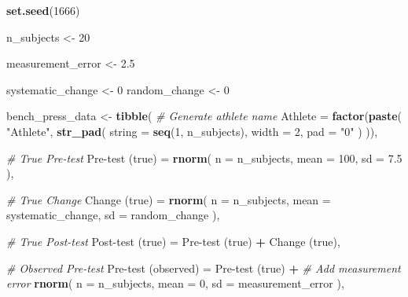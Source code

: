 \documentclass[
]{book}
\newenvironment{Shaded}{\begin{snugshade}}{\end{snugshade}}
\newcommand{\CommentTok}[1]{\textcolor[rgb]{0.56,0.35,0.01}{\textit{#1}}}
\newcommand{\DataTypeTok}[1]{\textcolor[rgb]{0.13,0.29,0.53}{#1}}
\newcommand{\DecValTok}[1]{\textcolor[rgb]{0.00,0.00,0.81}{#1}}
\newcommand{\FloatTok}[1]{\textcolor[rgb]{0.00,0.00,0.81}{#1}}
\newcommand{\KeywordTok}[1]{\textcolor[rgb]{0.13,0.29,0.53}{\textbf{#1}}}
\newcommand{\NormalTok}[1]{#1}
\newcommand{\OperatorTok}[1]{\textcolor[rgb]{0.81,0.36,0.00}{\textbf{#1}}}
\newcommand{\StringTok}[1]{\textcolor[rgb]{0.31,0.60,0.02}{#1}}
\begin{document}
\begin{Shaded}
\begin{Highlighting}[]
\KeywordTok{set.seed}\NormalTok{(}\DecValTok{1666}\NormalTok{)}

\NormalTok{n\_subjects <{-}}\StringTok{ }\DecValTok{20}

\NormalTok{measurement\_error <{-}}\StringTok{ }\FloatTok{2.5}

\NormalTok{systematic\_change <{-}}\StringTok{ }\DecValTok{0}
\NormalTok{random\_change <{-}}\StringTok{ }\DecValTok{0}

\NormalTok{bench\_press\_data <{-}}\StringTok{ }\KeywordTok{tibble}\NormalTok{(}
  \CommentTok{\# Generate athlete name}
  \DataTypeTok{Athlete =} \KeywordTok{factor}\NormalTok{(}\KeywordTok{paste}\NormalTok{(}
    \StringTok{"Athlete"}\NormalTok{,}
    \KeywordTok{str\_pad}\NormalTok{(}
      \DataTypeTok{string =} \KeywordTok{seq}\NormalTok{(}\DecValTok{1}\NormalTok{, n\_subjects),}
      \DataTypeTok{width =} \DecValTok{2}\NormalTok{,}
      \DataTypeTok{pad =} \StringTok{"0"}
\NormalTok{    )}
\NormalTok{  )),}

  \CommentTok{\# True Pre{-}test}
  \StringTok{\textasciigrave{}}\DataTypeTok{Pre{-}test (true)}\StringTok{\textasciigrave{}}\NormalTok{ =}\StringTok{ }\KeywordTok{rnorm}\NormalTok{(}
    \DataTypeTok{n =}\NormalTok{ n\_subjects,}
    \DataTypeTok{mean =} \DecValTok{100}\NormalTok{,}
    \DataTypeTok{sd =} \FloatTok{7.5}
\NormalTok{  ),}

  \CommentTok{\# True Change}
  \StringTok{\textasciigrave{}}\DataTypeTok{Change (true)}\StringTok{\textasciigrave{}}\NormalTok{ =}\StringTok{ }\KeywordTok{rnorm}\NormalTok{(}
    \DataTypeTok{n =}\NormalTok{ n\_subjects,}
    \DataTypeTok{mean =}\NormalTok{ systematic\_change,}
    \DataTypeTok{sd =}\NormalTok{ random\_change}
\NormalTok{  ),}

  \CommentTok{\# True Post{-}test}
  \StringTok{\textasciigrave{}}\DataTypeTok{Post{-}test (true)}\StringTok{\textasciigrave{}}\NormalTok{ =}\StringTok{ \textasciigrave{}}\DataTypeTok{Pre{-}test (true)}\StringTok{\textasciigrave{}} \OperatorTok{+}\StringTok{ \textasciigrave{}}\DataTypeTok{Change (true)}\StringTok{\textasciigrave{}}\NormalTok{,}

  \CommentTok{\# Observed Pre{-}test}
  \StringTok{\textasciigrave{}}\DataTypeTok{Pre{-}test (observed)}\StringTok{\textasciigrave{}}\NormalTok{ =}\StringTok{ \textasciigrave{}}\DataTypeTok{Pre{-}test (true)}\StringTok{\textasciigrave{}} \OperatorTok{+}
\StringTok{    }\CommentTok{\# Add measurement error}
\StringTok{    }\KeywordTok{rnorm}\NormalTok{(}
      \DataTypeTok{n =}\NormalTok{ n\_subjects,}
      \DataTypeTok{mean =} \DecValTok{0}\NormalTok{,}
      \DataTypeTok{sd =}\NormalTok{ measurement\_error}
\NormalTok{    ),}


\end{Highlighting}
\end{Shaded}
\end{document}
